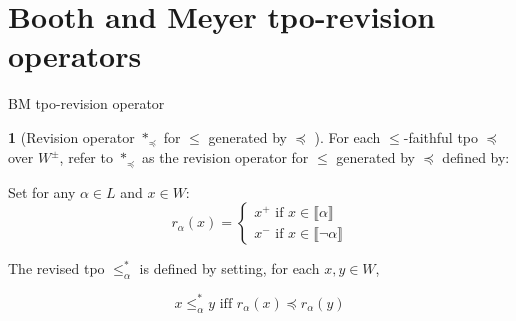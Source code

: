 \documentclass[12pt, notheorems]{beamer}
\newcommand{\modelsOf}[1]{\llbracket #1 \rrbracket}
\theoremstyle{definition}
\newtheorem{definition}{\translate{Definition}}
\theoremstyle{example}
\theoremstyle{plain}
\begin{document}
\section{Booth and Meyer tpo-revision operators}

\begin{frame}{BM tpo-revision operator}
    \label{slide:bm-revision-operator}
    \begin{definition}[Revision operator $\ast_{\preceq}$ for $\leq$ generated by $\preceq$ \cite{Booth2011}]
        \label{definition:revision-operator}
        For each $\leq$-faithful tpo $\preceq$ over $W^{\pm}$, refer to $\ast_{\preceq}$ as the revision operator for $\leq$ generated by $\preceq$ defined by:

        Set for any $\alpha \in L$ and $x \in W$:
        \begin{equation*}
            r_{\alpha}(x) = \left\{
            \begin{array}{ll}
                x^{+} \textrm{ if } x \in \modelsOf{\alpha} \\
                x^{-} \textrm{ if } x \in \modelsOf{\neg\alpha}
            \end{array}
            \right.
        \end{equation*}

        The revised tpo $\leq_{\alpha}^{\ast}$ is defined by setting, for each $x, y \in W$,

        \begin{equation*}
            x \leq_{\alpha}^{\ast} y \textrm{ iff } r_{\alpha}(x) \preceq r_{\alpha}(y)
        \end{equation*}
    \end{definition}


\end{frame}
\end{document}
